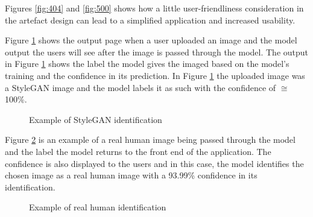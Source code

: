 Figures \ref{fig:404} and \ref{fig:500} shows how a little user-friendliness consideration in the artefact design can lead to a simplified application and increased usability. 


Figure \ref{fig:sgex} shows the output page when a user uploaded an image and the model output the users will see after the image is passed through the model. The output in Figure \ref{fig:sgex} shows the label the model gives the imaged based on the model's training and the confidence in its prediction. In Figure \ref{fig:sgex} the uploaded image was a StyleGAN image and the model labels it as such with the confidence of $\cong$100\%. 

\begin{figure}[H]%
\centering
{}%
\caption{Example of StyleGAN identification}%
\label{fig:sgex}%
\end{figure}

Figure \ref{fig:rhex} is an example of a real human image being passed through the model and the label the model returns to the front end of the application. The confidence is also displayed to the users and in this case, the model identifies the chosen image as a real human image with a 93.99\% confidence in its identification.

\begin{figure}[H]%
\centering
{}%
\caption{Example of real human identification}%
\label{fig:rhex}%
\end{figure}

